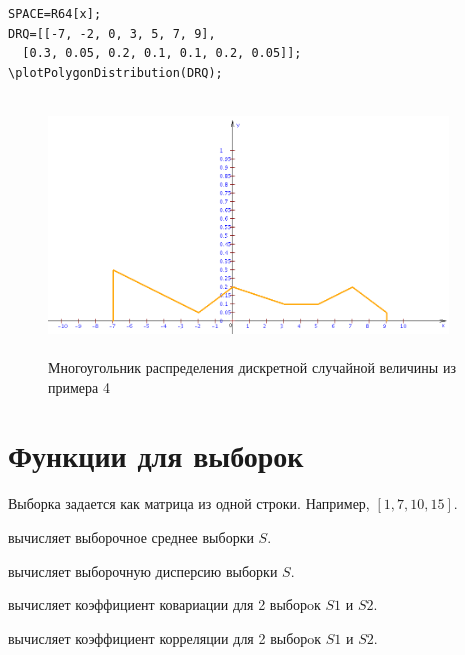 \begin{verbatim}
SPACE=R64[x];
DRQ=[[-7, -2, 0, 3, 5, 7, 9], 
  [0.3, 0.05, 0.2, 0.1, 0.1, 0.2, 0.05]];
\plotPolygonDistribution(DRQ);
\end{verbatim}


                       
\begin{figure}[!ht]
 \includegraphics[width=300.57pt, height=192.835pt]{pictures/8_1}
\caption{Многоугольник распределения дискретной случайной величины из примера 4}
\label{8_1}
\end{figure}

\section{Функции для выборок}

Выборка задается как матрица из одной строки.  Например,  $[1, 7, 10, 15]$. 

 вычисляет выборочное среднее выборки $S$. 

 вычисляет выборочную дисперсию выборки $S$. 

 вычисляет коэффициент ковариации для 2 выборoк $S1$ и $S2$. 

 вычисляет коэффициент корреляции для 2 выборoк $S1$ и $S2$. 

